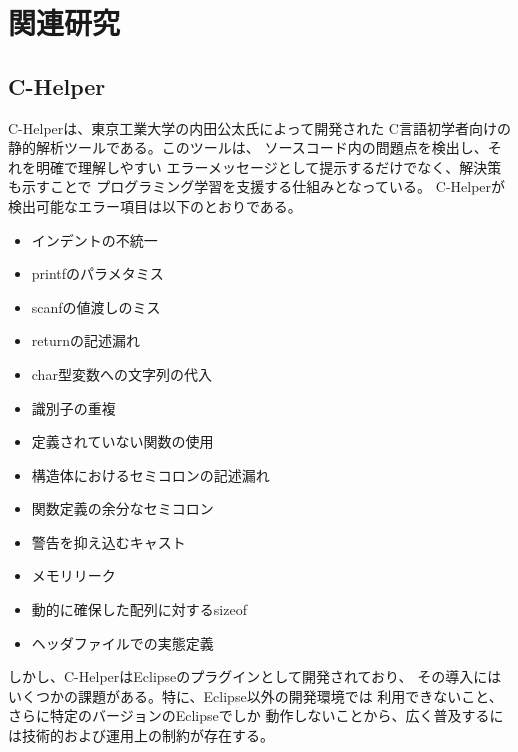 \documentclass{cssspaper}
\begin{document}
        \section{関連研究}
            \subsection{C-Helper}
            C-Helperは、東京工業大学の内田公太氏によって開発された
            C言語初学者向けの静的解析ツールである。このツールは、
            ソースコード内の問題点を検出し、それを明確で理解しやすい
            エラーメッセージとして提示するだけでなく、解決策も示すことで
            プログラミング学習を支援する仕組みとなっている。
            C-Helperが検出可能なエラー項目は以下のとおりである。
            \begin{itemize}
                \item インデントの不統一
                \item printfのパラメタミス
                \item scanfの値渡しのミス
                \item returnの記述漏れ
                \item char型変数への文字列の代入
                \item 識別子の重複
                \item 定義されていない関数の使用
                \item 構造体におけるセミコロンの記述漏れ
                \item 関数定義の余分なセミコロン
                \item 警告を抑え込むキャスト
                \item メモリリーク
                \item 動的に確保した配列に対するsizeof
                \item ヘッダファイルでの実態定義
            \end{itemize}
            しかし、C-HelperはEclipseのプラグインとして開発されており、
            その導入にはいくつかの課題がある。特に、Eclipse以外の開発環境では
            利用できないこと、さらに特定のバージョンのEclipseでしか
            動作しないことから、広く普及するには技術的および運用上の制約が存在する。
\end{document}
